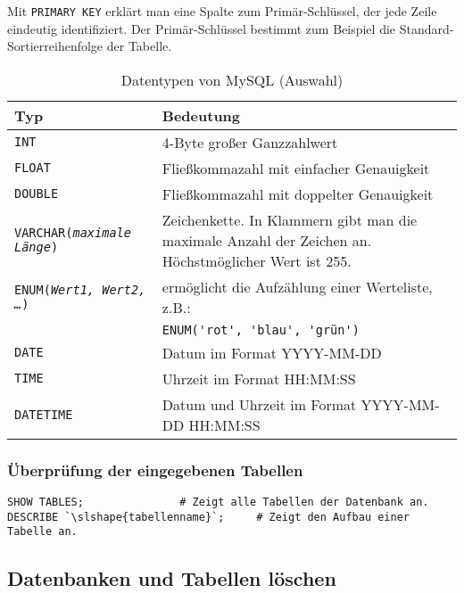 Mit \lstinline{PRIMARY KEY} erklärt man eine Spalte zum Primär-Schlüssel, der
jede Zeile eindeutig identifiziert. Der Primär-Schlüssel bestimmt zum Beispiel
die Standard-Sortierreihenfolge der Tabelle.

\begin{table}[h]
\centering
\begin{tabular}{|l|p{11cm}|}
\hline
{\bfseries Typ} & {\bfseries Bedeutung}\\
\hline
{\lstinline!INT!} & 4-Byte großer Ganzzahlwert\\
\hline
{\lstinline!FLOAT!} & Fließkommazahl mit einfacher Genauigkeit\\
\hline
{\lstinline!DOUBLE!} & Fließkommazahl mit doppelter Genauigkeit\\
\hline
{\lstinline!VARCHAR(!}\texttt{\slshape{maximale Länge}}{\lstinline!)!} &
Zeichenkette. In Klammern gibt man die maximale Anzahl der Zeichen an.
Höchstmöglicher Wert ist 255.\\
\hline
{\lstinline!ENUM(!}\texttt{\slshape{Wert1, Wert2, \ldots}}{\lstinline!)!}
& ermöglicht die Aufzählung einer Werteliste, z.B.:\\
& {\lstinline!ENUM('rot', 'blau', '!}\texttt{grün}{\lstinline!')!}\\
\hline
{\lstinline!DATE!} & Datum im Format YYYY-MM-DD\\
\hline
{\lstinline!TIME!} & Uhrzeit im Format HH:MM:SS\\
\hline
{\lstinline!DATETIME!} & Datum und Uhrzeit im Format YYYY-MM-DD HH:MM:SS\\
\hline
\end{tabular}
\caption{Datentypen von MySQL (Auswahl)}
\label{tab:mysql-datentypen}
\end{table}

\subsubsection{Überprüfung der eingegebenen Tabellen}

\begin{lstlisting}
SHOW TABLES;               # Zeigt alle Tabellen der Datenbank an.
DESCRIBE `\slshape{tabellenname}`;     # Zeigt den Aufbau einer Tabelle an.
\end{lstlisting}

\subsection{Datenbanken und Tabellen löschen}


